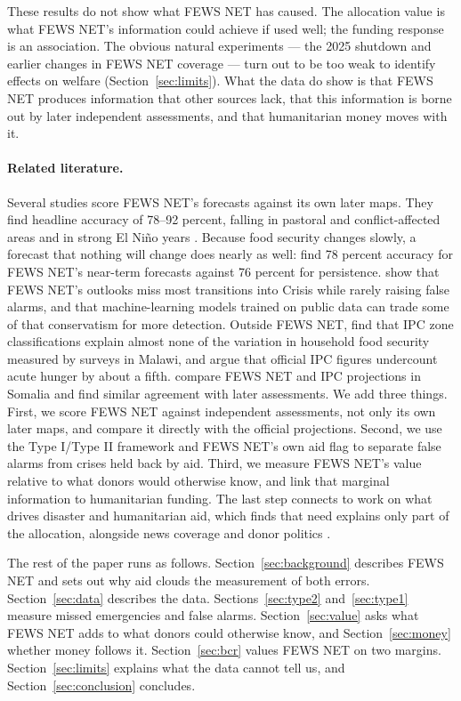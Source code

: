 \documentclass[11pt]{article}
\begin{document}
These results do not show what FEWS NET has caused. The allocation value is what FEWS NET's information could achieve if used well; the funding response is an association. The obvious natural experiments --- the 2025 shutdown and earlier changes in FEWS NET coverage --- turn out to be too weak to identify effects on welfare (Section~\ref{sec:limits}). What the data do show is that FEWS NET produces information that other sources lack, that this information is borne out by later independent assessments, and that humanitarian money moves with it.

\paragraph{Related literature.} Several studies score FEWS NET's forecasts against its own later maps. They find headline accuracy of 78--92 percent, falling in pastoral and conflict-affected areas and in strong El Ni\~no years \citep{choularton2019,krishnamurthy2020,backer2021,bertetti2024}. Because food security changes slowly, a forecast that nothing will change does nearly as well: \citet{bertetti2024} find 78 percent accuracy for FEWS NET's near-term forecasts against 76 percent for persistence. \citet{andree2020} show that FEWS NET's outlooks miss most transitions into Crisis while rarely raising false alarms, and that machine-learning models trained on public data can trade some of that conservatism for more detection. Outside FEWS NET, \citet{lentz2019} find that IPC zone classifications explain almost none of the variation in household food security measured by surveys in Malawi, and \citet{lentz2025} argue that official IPC figures undercount acute hunger by about a fifth. \citet{seyffer2026} compare FEWS NET and IPC projections in Somalia and find similar agreement with later assessments. We add three things. First, we score FEWS NET against independent assessments, not only its own later maps, and compare it directly with the official projections. Second, we use the Type I/Type II framework and FEWS NET's own aid flag to separate false alarms from crises held back by aid. Third, we measure FEWS NET's value relative to what donors would otherwise know, and link that marginal information to humanitarian funding. The last step connects to work on what drives disaster and humanitarian aid, which finds that need explains only part of the allocation, alongside news coverage and donor politics \citep{eisensee2007news,drury2005politics,fink2011determinants}.

The rest of the paper runs as follows. Section~\ref{sec:background} describes FEWS NET and sets out why aid clouds the measurement of both errors. Section~\ref{sec:data} describes the data. Sections~\ref{sec:type2} and~\ref{sec:type1} measure missed emergencies and false alarms. Section~\ref{sec:value} asks what FEWS NET adds to what donors could otherwise know, and Section~\ref{sec:money} whether money follows it. Section~\ref{sec:bcr} values FEWS NET on two margins. Section~\ref{sec:limits} explains what the data cannot tell us, and Section~\ref{sec:conclusion} concludes.
\end{document}
